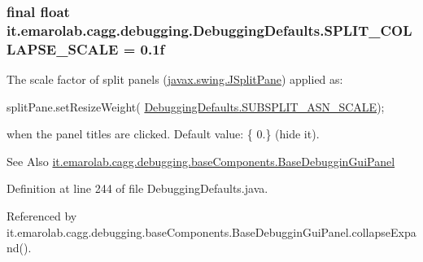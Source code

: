 \hypertarget{classit_1_1emarolab_1_1cagg_1_1debugging_1_1DebuggingDefaults_a44caf35f6fb485e185202177f3b02972}{
\subsubsection[{S\-P\-L\-I\-T\-\_\-\-C\-O\-L\-L\-A\-P\-S\-E\-\_\-\-S\-C\-A\-L\-E}]{\setlength{\rightskip}{0pt plus 5cm}final float it.\-emarolab.\-cagg.\-debugging.\-Debugging\-Defaults.\-S\-P\-L\-I\-T\-\_\-\-C\-O\-L\-L\-A\-P\-S\-E\-\_\-\-S\-C\-A\-L\-E = 0.\-1f\hspace{0.3cm}{\ttfamily [static]}}}\label{classit_1_1emarolab_1_1cagg_1_1debugging_1_1DebuggingDefaults_a44caf35f6fb485e185202177f3b02972}
The scale factor of split panels (\hyperlink{}{javax.\-swing.\-J\-Split\-Pane}) applied as\-: 
\begin{DoxyCode}
splitPane.setResizeWeight( \hyperlink{classit_1_1emarolab_1_1cagg_1_1debugging_1_1DebuggingDefaults_adf7088c65243e935301c9a31f4dfe2b4}{DebuggingDefaults.SUBSPLIT\_ASN\_SCALE}); 
\end{DoxyCode}
 when the panel titles are clicked. Default value\-: \{ 0.\} (hide it). \begin{DoxySeeAlso}{See Also}
\hyperlink{classit_1_1emarolab_1_1cagg_1_1debugging_1_1baseComponents_1_1BaseDebugginGuiPanel}{it.\-emarolab.\-cagg.\-debugging.\-base\-Components.\-Base\-Debuggin\-Gui\-Panel} 
\end{DoxySeeAlso}


Definition at line 244 of file Debugging\-Defaults.\-java.



Referenced by it.\-emarolab.\-cagg.\-debugging.\-base\-Components.\-Base\-Debuggin\-Gui\-Panel.\-collapse\-Expand().

